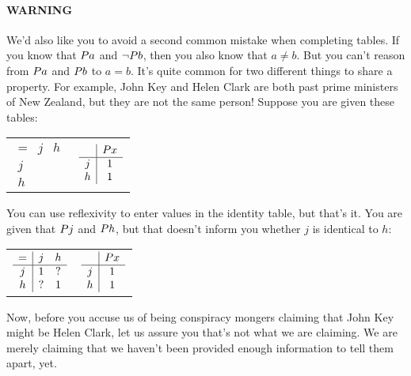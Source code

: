 \documentclass[PHIL101-Textbook.tex]{subfiles}
\begin{document}
\paragraph{WARNING} We'd also like you to avoid a second common mistake when completing tables. If you know that $\mathord{P}{a}$ and $\neg \mathord{P}{b}$, then you also know that $a \neq b$. But you can't reason from $\mathord{P}{a}$ and $\mathord{P}{b}$ to $a=b$. It's quite common for two different things to share a property. For example, John Key and Helen Clark are both past prime ministers of New Zealand, but they are not the same person! Suppose you are given these tables: 

\begin{center}
  \begin{tabular}{ll}
  $\begin{array}{c|cc}
	   = & j & h\\ \hline
	   j &&\\
	   h
	 \end{array}$  & 
					 $\begin{array}{c|c}
	   & \mathord{P}{x} \\ \hline
	   j & 1\\
	   h & 1
	 \end{array}$
  \end{tabular}
\end{center}

\noindent You can use reflexivity to enter values in the identity table, but that's it. You are given that $\mathord{P}{j}$ and $\mathord{P}{h}$, but that doesn't inform you whether $j$ is identical to $h$: 

\begin{center}
  \begin{tabular}{ll}
  $\begin{array}{c|cc}
	   = & j & h\\ \hline
	   j &1&?\\
	   h &?&1
	 \end{array}$  & 
					 $\begin{array}{c|c}
	   & \mathord{P}{x} \\ \hline
	   j & 1\\
	   h & 1
	 \end{array}$
  \end{tabular}
\end{center}

Now, before you accuse us of being conspiracy mongers claiming that John Key might be Helen Clark, let us assure you that's not what we are claiming. We are merely claiming that we haven't been provided enough information to tell them apart, yet.
\end{document}

